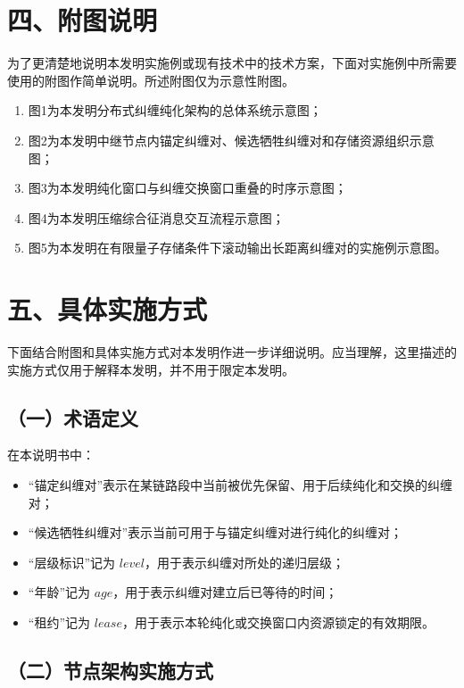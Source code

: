 \documentclass[12pt,a4paper]{article}
\begin{document}
\section*{四、附图说明}

为了更清楚地说明本发明实施例或现有技术中的技术方案，下面对实施例中所需要使用的附图作简单说明。所述附图仅为示意性附图。

\begin{enumerate}[leftmargin=2em]
    \item 图1为本发明分布式纠缠纯化架构的总体系统示意图；
    \item 图2为本发明中继节点内锚定纠缠对、候选牺牲纠缠对和存储资源组织示意图；
    \item 图3为本发明纯化窗口与纠缠交换窗口重叠的时序示意图；
    \item 图4为本发明压缩综合征消息交互流程示意图；
    \item 图5为本发明在有限量子存储条件下滚动输出长距离纠缠对的实施例示意图。
\end{enumerate}

\section*{五、具体实施方式}

下面结合附图和具体实施方式对本发明作进一步详细说明。应当理解，这里描述的实施方式仅用于解释本发明，并不用于限定本发明。

\subsection*{（一）术语定义}

在本说明书中：
\begin{itemize}[leftmargin=2em]
    \item ``锚定纠缠对''表示在某链路段中当前被优先保留、用于后续纯化和交换的纠缠对；
    \item ``候选牺牲纠缠对''表示当前可用于与锚定纠缠对进行纯化的纠缠对；
    \item ``层级标识''记为 $level$，用于表示纠缠对所处的递归层级；
    \item ``年龄''记为 $age$，用于表示纠缠对建立后已等待的时间；
    \item ``租约''记为 $lease$，用于表示本轮纯化或交换窗口内资源锁定的有效期限。
\end{itemize}

\subsection*{（二）节点架构实施方式}
\end{document}
